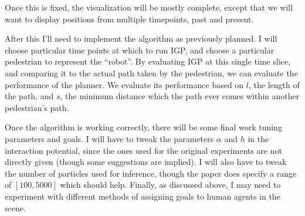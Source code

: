 \documentclass[a4paper,11pt,headings=small]{article}
\begin{document}
Once this is fixed, the visualization will be mostly complete, except that we will want to display positions from multiple timepoints, past and present.

After this I'll need to implement the algorithm as previously planned. I will choose particular time points at which to run IGP, and choose a particular pedestrian to represent the ``robot''. By evaluating IGP at this single time slice, and comparing it to the actual path taken by the pedestrian, we can evaluate the performance of the planner. We evaluate its performance based on $l$, the length of the path, and $s$, the minimum distance which the path ever comes within another pedestrian's path.

Once the algorithm is working correctly, there will be some final work tuning parameters and goals. I will have to tweak the parameters $\alpha$ and $h$ in the interaction potential, since the ones used for the original experiments are not directly given (though some suggestions are implied). I will also have to tweak the number of particles used for inference, though the paper does specify a range of $[100,5000]$ which should help. Finally, as discussed above, I may need to experiment with different methods of assigning goals to human agents in the scene.




\end{document}
